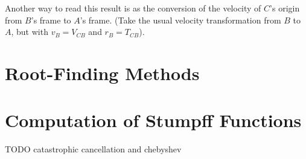 \documentclass{article}
\numberwithin{equation}{subsection}
\begin{document}
Another way to read this result is as the conversion of the velocity of $C$'s origin from $B$'s frame to $A$'s frame. (Take the usual velocity transformation from $B$ to $A$, but with $v_B = V_{CB}$ and $r_B = T_{CB}$).


\section{Root-Finding Methods}

\section{Computation of Stumpff Functions}

TODO catastrophic cancellation and chebyshev
\end{document}
